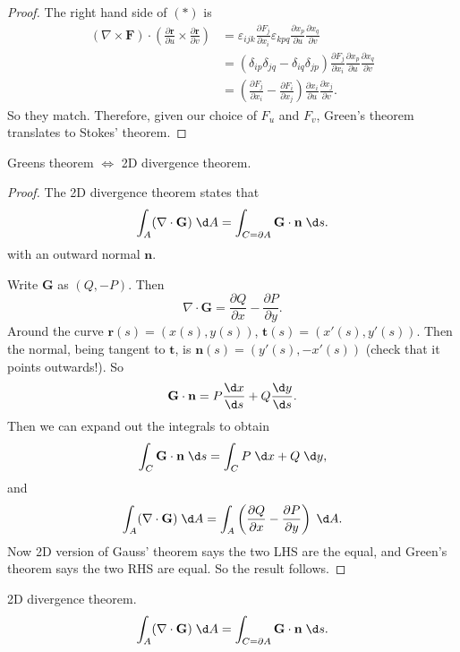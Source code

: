 \documentclass[a4paper]{article}
\begin{document}
\begin{proof}
  The right hand side of $(*)$ is
  \begin{align*}
    (\nabla \times \mathbf{F})\cdot \left(\frac{\partial \mathbf{r}}{\partial u}\times \frac{\partial \mathbf{r}}{\partial v}\right) &= \varepsilon_{ijk}\frac{\partial F_j}{\partial x_i}\varepsilon_{kpq}\frac{\partial x_p}{\partial u}\frac{\partial x_q}{\partial v}\\
    &= (\delta_{ip}\delta_{jq} - \delta_{iq}\delta_{jp}) \frac{\partial F_j}{\partial x_i}\frac{\partial x_p}{\partial u}\frac{\partial x_q}{\partial v}\\
    &= \left(\frac{\partial F_j}{\partial x_i} - \frac{\partial F_i}{\partial x_j}\right)\frac{\partial x_i}{\partial u}\frac{\partial x_j}{\partial v}.
  \end{align*}
  So they match. Therefore, given our choice of $F_u$ and $F_v$, Green's theorem translates to Stokes' theorem.
\end{proof}


\begin{prop}
  Greens theorem $\Leftrightarrow$ 2D divergence theorem.
\end{prop}

\begin{proof}
  The 2D divergence theorem states that
  \[
    \int_A (\nabla\cdot \mathbf{G})\;\d A = \int_{C = \partial A} \mathbf{G}\cdot \mathbf{n}\;\d s.
  \]
  with an outward normal $\mathbf{n}$.

  Write $\mathbf{G}$ as $(Q, -P)$. Then
  \[
    \nabla\cdot \mathbf{G} = \frac{\partial Q}{\partial x} - \frac{\partial P}{\partial y}.
  \]
  Around the curve $\mathbf{r}(s) = (x(s), y(s))$, $\mathbf{t}(s) = (x'(s), y'(s))$. Then the normal, being tangent to $\mathbf{t}$, is $\mathbf{n}(s) = (y'(s), -x'(s))$ (check that it points outwards!). So
  \[
    \mathbf{G}\cdot \mathbf{n} = P\frac{\d x}{\d s} + Q\frac{\d y}{\d s}.
  \]
  Then we can expand out the integrals to obtain
  \[
    \int_C \mathbf{G}\cdot \mathbf{n}\;\d s = \int_C P\;\d x + Q\;\d y,
  \]
  and
  \[
    \int_A(\nabla\cdot \mathbf{G})\;\d A = \int_A\left(\frac{\partial Q}{\partial x} - \frac{\partial P}{\partial y}\right)\;\d A.
  \]
  Now 2D version of Gauss' theorem says the two LHS are the equal, and Green's theorem says the two RHS are equal. So the result follows.
\end{proof}

\begin{prop}
  2D divergence theorem.
  \[
    \int_A (\nabla\cdot \mathbf{G})\;\d A = \int_{C = \partial A} \mathbf{G}\cdot \mathbf{n}\;\d s.
  \]
\end{prop}
\end{document}
